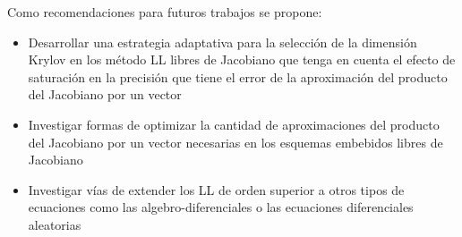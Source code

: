 \begin{recomendations}

Como recomendaciones para futuros trabajos se propone:
\begin{itemize}
	\item Desarrollar una estrategia adaptativa para la selección de la dimensión Krylov en los método LL libres de Jacobiano que tenga en cuenta el efecto de saturación en la precisión que tiene el error de la aproximación del producto del Jacobiano por un vector
	\item Investigar formas de optimizar la cantidad de aproximaciones del producto del Jacobiano por un vector necesarias en los esquemas embebidos libres de Jacobiano
	\item Investigar vías de extender los LL de orden superior a otros tipos de ecuaciones como las algebro-diferenciales o las ecuaciones diferenciales aleatorias
\end{itemize}

\end{recomendations}
